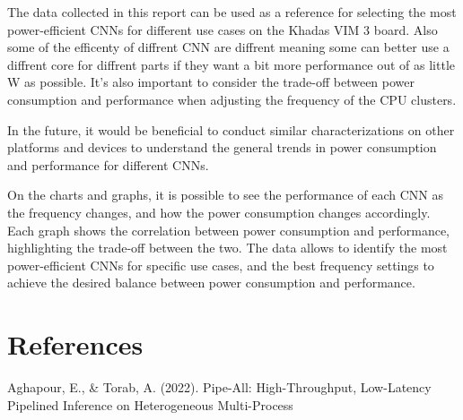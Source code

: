 \documentclass[a4paper, 12pt, fleqn]{article}
\begin{document}
The data collected in this report can be used as a reference for selecting the most power-efficient CNNs for different use cases on the Khadas VIM 3 board. Also some of the efficenty of diffrent CNN are diffrent meaning some can better use  a diffrent core for diffrent parts if they want a bit more performance out of as little W as possible. It's also important to consider the trade-off between power consumption and performance when adjusting the frequency of the CPU clusters.

In the future, it would be beneficial to conduct similar characterizations on other platforms and devices to understand the general trends in power consumption and performance for different CNNs.

On the charts and graphs, it is possible to see the performance of each CNN as the frequency changes, and how the power consumption changes accordingly. Each graph shows the correlation between power consumption and performance, highlighting the trade-off between the two. The data allows to identify the most power-efficient CNNs for specific use cases, and the best frequency settings to achieve the desired balance between power consumption and performance.

\section{References}
Aghapour, E., \& Torab, A. (2022). Pipe-All: High-Throughput, Low-Latency Pipelined Inference on Heterogeneous Multi-Process
\end{document}
